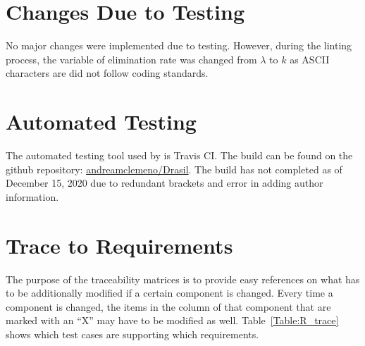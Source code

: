 \documentclass[12pt, titlepage]{article}
\begin{document}
\section{Changes Due to Testing}\label{changes}

No major changes were implemented due to testing. However, during the linting 
process, the variable of elimination rate was changed from $\lambda$ to $k$ as 
ASCII characters are did not follow coding standards.

\section{Automated Testing}\label{autotesting}

The automated testing tool used by \progname{} is Travis CI. The build can be 
found on the github repository: \href{https://github.com/andreamclemeno/Drasil}{andreamclemeno/Drasil}. The build has not completed as of December 15, 2020 due to redundant brackets and error in adding author information. 

		
\section{Trace to Requirements}


The purpose of the traceability matrices is to provide easy references on what
has to be additionally modified if a certain component is changed.  Every time a
component is changed, the items in the column of that component that are marked
with an ``X'' may have to be modified as well.  Table~\ref{Table:R_trace} shows 
which test cases are supporting which requirements.
\end{document}
